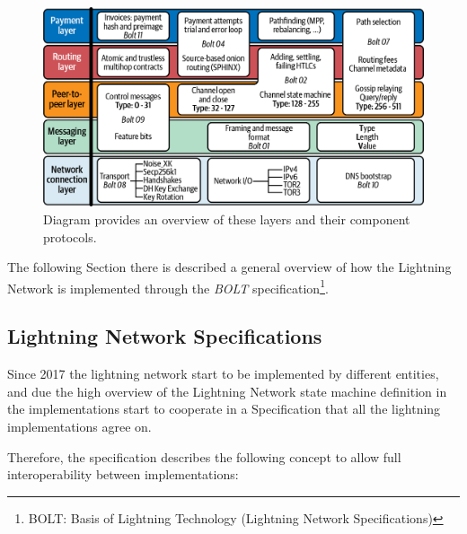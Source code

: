 \begin{figure}[h]
  \begin{center}
  \includegraphics[width=0.6\columnwidth]{imgs/mtln_0601.png}
  \end{center}
  \caption{Diagram provides an overview of these layers and their component protocols.}
  \label{fig:lightning-stack}
\end{figure}

The following Section there is described a general overview of how the Lightning Network is implemented through the
\emph{BOLT} specification\footnote{BOLT: Basis of Lightning Technology (Lightning Network Specifications)}.

\subsection{Lightning Network Specifications}

Since 2017 the lightning network start to be implemented by different entities,
and due the high overview of the Lightning Network state machine definition in \cite{lightning-network-paper}
the implementations start to cooperate in a Specification that all the lightning implementations agree on.

Therefore, the specification describes the following concept to allow full interoperability between implementations:

